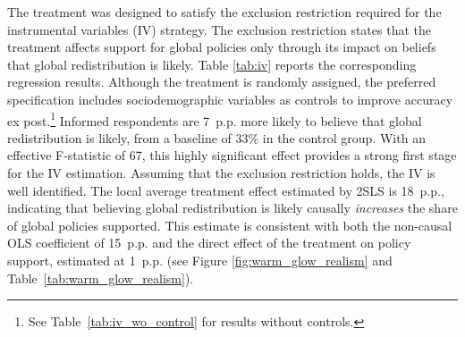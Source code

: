 \documentclass[12pt,english]{article}
\begin{document}
The treatment was designed to satisfy the exclusion restriction required for the instrumental variables (IV) strategy. The exclusion restriction states that the treatment affects support for global policies only through its impact on beliefs that global redistribution is likely. Table \ref{tab:iv} reports the corresponding regression results. Although the treatment is randomly assigned, the preferred specification includes sociodemographic variables as controls to improve accuracy ex post.\footnote{See Table~\ref{tab:iv_wo_control} for results without controls.
} 
Informed respondents are 7~p.p. more likely to believe that global redistribution is likely, from a baseline of 33\% in the control group. With an effective F-statistic of 67, this highly significant effect provides a strong first stage for the IV estimation. Assuming that the exclusion restriction holds, the IV is well identified. The local average treatment effect estimated by 2SLS is 18~p.p., indicating that believing global redistribution is likely causally \textit{increases} the share of global policies supported. This estimate is consistent with both the non-causal OLS coefficient of 15~p.p. and the direct effect of the treatment on policy support, estimated at 1~p.p. (see Figure \ref{fig:warm_glow_realism} and Table~\ref{tab:warm_glow_realism}).

\end{document}
